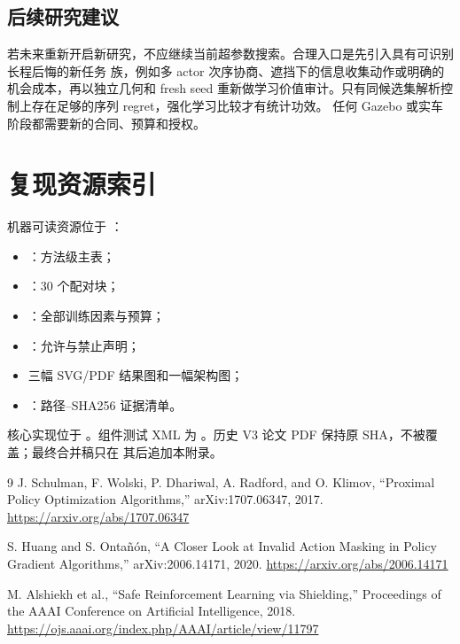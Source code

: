 \documentclass[12pt,a4paper,oneside]{report}
\begin{document}
\section{后续研究建议}
若未来重新开启新研究，不应继续当前超参数搜索。合理入口是先引入具有可识别长程后悔的新任务
族，例如多 actor 次序协商、遮挡下的信息收集动作或明确的机会成本，再以独立几何和 fresh seed
重新做学习价值审计。只有同候选集解析控制上存在足够的序列 regret，强化学习比较才有统计功效。
任何 Gazebo 或实车阶段都需要新的合同、预算和授权。

\chapter{复现资源索引}
机器可读资源位于 ：
\begin{itemize}
  \item {}：方法级主表；
  \item {}：30 个配对块；
  \item {}：全部训练因素与预算；
  \item {}：允许与禁止声明；
  \item 三幅 SVG/PDF 结果图和一幅架构图；
  \item {}：路径--SHA256 证据清单。
\end{itemize}
核心实现位于 。组件测试 XML 为
。历史 V3 论文 PDF 保持原 SHA，不被覆盖；最终合并稿只在
其后追加本附录。

\begin{thebibliography}{9}
J. Schulman, F. Wolski, P. Dhariwal, A. Radford, and O. Klimov,
``Proximal Policy Optimization Algorithms,'' arXiv:1707.06347, 2017.
\url{https://arxiv.org/abs/1707.06347}

S. Huang and S. Ontañón,
``A Closer Look at Invalid Action Masking in Policy Gradient Algorithms,''
arXiv:2006.14171, 2020.
\url{https://arxiv.org/abs/2006.14171}

M. Alshiekh et al., ``Safe Reinforcement Learning via Shielding,''
Proceedings of the AAAI Conference on Artificial Intelligence, 2018.
\url{https://ojs.aaai.org/index.php/AAAI/article/view/11797}
\end{thebibliography}
\end{document}
